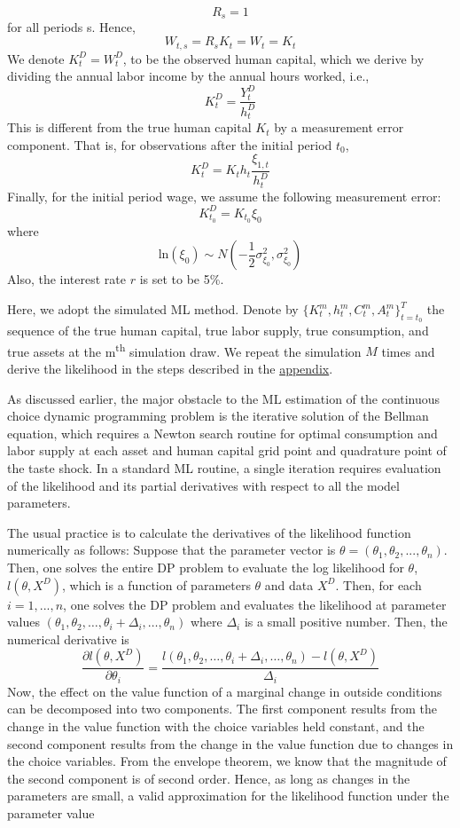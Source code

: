 \documentclass[\econtexRoot/ImaiKeane]{subfiles}
\begin{document}
    $$ R_s = 1 $$
    for all periods s. Hence,
    $$W_{t,s}=R_s K_t = W_t = K_t $$
    We denote $K_t^D = W_t^D$, to be the observed human capital, which we derive by dividing the annual labor income by the annual hours worked, i.e.,
    $$ K_t^D = \dfrac{Y_t^D}{h_t^D}$$
    This is different from the true human capital $K_t$ by a measurement error component. That is, for observations after the initial period $t_0$,
    $$ K_t^D = K_t h_t \dfrac{\xi_{1,t}}{h_t^D}$$
    Finally, for the initial period wage, we assume the following measurement error:
    $$K_{t_0}^D = K_{t_0} \xi_0$$
    where
    $$\text{ln}(\xi_0) \sim N(-\frac{1}{2} \sigma_{\xi_0}^2,\sigma_{\xi_0}^2)$$
    Also, the interest rate $r$ is set to be 5\%.\par
    Here, we adopt the simulated ML method. Denote by $\{K_t^m, h_t^m, C_t^m, A_t^m\}_{t=t_0}^T$ the sequence of the true human capital, true labor supply, true consumption, and true assets at the m\textsuperscript{th} simulation draw. We repeat the simulation $M$ times and derive the likelihood in the steps described in the \hyperref[appendix]{appendix}. \par
   As discussed earlier, the major obstacle to the ML estimation of the continuous choice dynamic programming problem is the iterative solution of the Bellman equation, which requires a Newton search routine for optimal consumption and labor supply at each asset and human capital grid point and quadrature point of the taste shock. In a standard ML routine, a single iteration requires evaluation of the likelihood and its partial derivatives with respect to all the model parameters. \par
   The usual practice is to calculate the derivatives of the likelihood function numerically as follows: Suppose that the parameter vector is $\theta = (\theta_1, \theta_2,... ,\theta_n)$. Then, one solves the entire DP problem to evaluate the log likelihood for $\theta$, $l(\theta,X^D)$, which is a function of parameters $\theta$ and data $X^D$. Then, for each $i = 1,..., n$, one solves the DP problem and evaluates the likelihood at parameter values $(\theta_1, \theta_2, \dots, \theta_i + \Delta_i, \dots, \theta_n)$ where $\Delta_i$ is a small positive number. Then, the numerical derivative is
   $$\dfrac{\partial l(\theta,X^D)}{\partial \theta_i} = \dfrac{l(\theta_1, \theta_2, \dots, \theta_i + \Delta_i, \dots, \theta_n)- l(\theta,X^D)}{\Delta_i} $$
 Now, the effect on the value function of a marginal change in outside conditions can be decomposed into two components. The first component results from the change in the value function with the choice variables held constant, and the second component results from the change in the value function due to changes in the choice variables. From the envelope theorem, we know that the magnitude of the second component is of second order. Hence, as long as changes in the parameters are small, a valid approximation for the likelihood function under the parameter value
\end{document}
